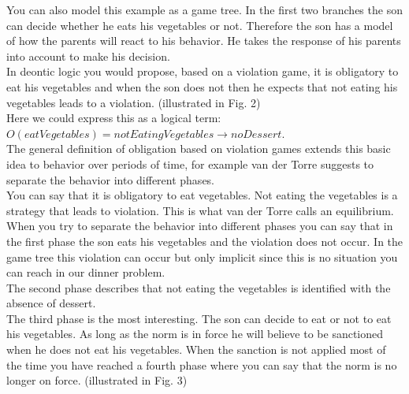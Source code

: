 \documentclass[conference]{hehe}
\begin{document}
You can also model this example as a game tree. In the first two branches the son can decide whether he eats his vegetables or not. Therefore the son has a model of how the parents will react to his behavior. He takes the response of his parents into account to make his decision.\\
In deontic logic you would propose, based on a violation game, it is obligatory to eat his vegetables and when the son does not then he expects that not eating his vegetables leads to a violation. (illustrated in Fig. 2)\\
Here we could express this as a logical term:\\
$O(eatVegetables) = notEatingVegetables \to noDessert$. \\

The general definition of obligation based on violation games extends this basic idea to behavior over periods of time, for example van der Torre suggests to separate the behavior into different phases.\\
You can say that it is obligatory to eat vegetables. Not eating the vegetables is a strategy that leads to violation. This is what van der Torre calls an equilibrium.\\
When you try to separate the behavior into different phases you can say that in the first phase the son eats his vegetables and the violation does not occur. In the game tree this violation can occur but only implicit since this is no situation you can reach in our dinner problem.\\
The second phase describes that not eating the vegetables is identified with the absence of dessert.\\
The third phase is the most interesting. The son can decide to eat or not to eat his vegetables. As long as the norm is in force he will believe to be sanctioned when he does not eat his vegetables. When the sanction is not applied most of the time you have reached a fourth phase where you can say that the norm is no longer on force. (illustrated in Fig. 3)\\
\end{document}
